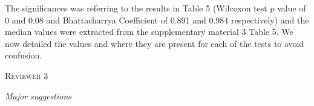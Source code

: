 \documentclass[12pt,letterpaper]{article}
\renewcommand{\section}[1]{%
\bigskip
\begin{center}
\begin{Large}
\normalfont\scshape #1
\medskip
\end{Large}
\end{center}}
\renewcommand{\subsection}[1]{%
\bigskip
\begin{center}
\begin{large}
\normalfont\itshape #1
\end{large}
\end{center}}
\begin{document}
\begin{enumerate}
The significances was referring to the results in Table 5 (Wilcoxon test $p$ value of 0 and 0.08 and Bhattacharrya Coefficient of 0.891 and 0.984 respectively) and the median values were extracted from the supplementary material 3 Table 5.
We now detailed the values and where they are present for each of the tests to avoid confusion.

\end{enumerate}





%
%





\section{Reviewer 3}

\subsection{Major suggestions}
\end{document}
